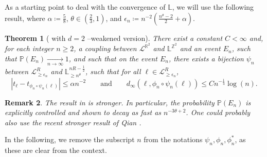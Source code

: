 \documentclass[11pt]{article}
\newtheorem{theorem}{Theorem}[section]
\newtheorem{remark}[theorem]{Remark}
\begin{document}
As a starting point to deal with the convergence of $\mathbb{L}$, we will use the following result,
where $\alpha\coloneqq\frac{5}{8}$, $\theta\in ( \frac{2}{3}, 1)$, and
 $\epsilon_n\coloneqq n^{-2}( \frac{n^\theta-2}{2}+\alpha) $.
\begin{theorem}[{\cite[Theorem 2.2]{SapozhnikovShiraishi}} with $d=2$ --weakened version]
   \label{th:bls}
   There exist a constant $C<\infty$ and, for each integer $n\geq 2$, a coupling between $\mathcal{L}^{\mathbb{R}^2}$ and $\mathbb{L}^{\mathbb{Z}^2}$ and
   an event $E_{n}$, such that $\mathbb{P}(E_{n})\underset{n\to \infty}\longrightarrow 1$, and such that on the event $E_n$,
   there exists a bijection $\psi_n$ between $\mathcal{L}^{R }_{\geq \epsilon_n }$ and $\mathbb{L}^{n R-\frac{1}{2}}_{\geq n^\theta}$,
   such that for all $\ell \in\mathcal{L}^{R }_{\geq  \epsilon_n }$,
   \begin{equation}
   | t_{\ell} - t_{\phi_n\circ \psi_n(\ell)}| \leq \alpha n^{-2} \qquad  \mbox{and} \qquad d_\infty(\ell, \phi_n\circ \psi_n(\ell))\leq C n^{-\frac{1}{4}} \log(n).
   \label{eq:dinfty}
   \end{equation}
\end{theorem}
\begin{remark}
    The result in \cite{SapozhnikovShiraishi} is stronger. In particular, the probability $\mathbb{P}(E_{n})$ is explicitly controlled and shown to decay as fast as $n^{-3\theta+2}$. One could probably also use the recent stronger result of Qian \cite{Qian}.
\end{remark}

In the following, we remove the subscript $n$ from the notations $ \psi_n,\phi_n,\phi^*_n$, as these are clear from the context.
\end{document}
